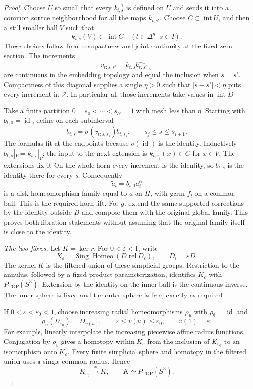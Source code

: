 \begin{proof}
Choose $U$ so small that every $k_{t,s}^{-1}$ is defined on $U$
and sends it into a common source neighbourhood for all the maps
$k_{t,s'}$.  Choose $C\subset\operatorname{int}U$, and then a
still smaller ball $V$ such that
\[
                  k_{t,s}(V)\subset\operatorname{int}C
                  \quad(t\in\Delta^q,\ s\in I).
\]
These choices follow from compactness and joint continuity at the
fixed zero section.  The increments
\[
          v_{t;s,s'}=k_{t,s}k_{t,s'}^{-1}|_U
\]
are continuous in the embedding topology and equal the inclusion
when $s=s'$.  Compactness of this diagonal supplies a single
$\eta>0$ such that $|s-s'|<\eta$ puts every increment in
$\mathcal V$.  In particular all those increments take values in
$\operatorname{int}D$.

Take a finite partition $0=s_0<\cdots<s_N=1$ with mesh less
than $\eta$.  Starting with $b_{t,0}=\operatorname{id}$, define
on each subinterval
\[
 b_{t,s}=\sigma(v_{t;s,s_j})b_{t,s_j},
                  \qquad s_j\leq s\leq s_{j+1}.
\]
The formulas fit at the endpoints because $\sigma(\operatorname{id})$
is the identity.  Inductively $b_{t,s}|_V=k_{t,s}|_V$: the input
to the next extension is $k_{t,s_j}(x)\in C$ for $x\in V$.
The extensions fix $0$.  On the whole horn every increment is
the identity, so $b_{t,s}$ is the identity there for every $s$.
Consequently
\[
                       \widetilde a_t=b_{t,1}a^0_t
\]
is a disk-homeomorphism family equal to $a$ on $H$, with germ
$f_t$ on a common ball.  This is the required horn lift.  For $g$,
extend the same supported corrections by the identity outside
$D$ and compose them with the original global family.  This proves
both fibration statements without assuming that the original
family itself is close to the identity.

\medskip\noindent\textit{The two fibres.}
Let $K=\ker r$.  For $0<\varepsilon<1$, write
\[
 K_\varepsilon=
 \operatorname{Sing}\operatorname{Homeo}
              (D\;\mathrm{rel}\;D_\varepsilon),
 \qquad D_\varepsilon=\varepsilon D.
\]
The kernel $K$ is the filtered union of these simplicial groups.
Restriction to the annulus, followed by a fixed product
parameterization, identifies $K_\varepsilon$ with
$P_{\mathrm{TOP}}(S^3)$.  Extension by the identity on the inner
ball is the continuous inverse.  The inner sphere is fixed and
the outer sphere is free, exactly as required.

If $0<\varepsilon<\varepsilon_0<1$, choose increasing radial
homeomorphisms $\rho_u$ with $\rho_0=\operatorname{id}$ and
\[
 \rho_u(D_{\varepsilon_0})=D_{v(u)},\qquad
 \varepsilon\leq v(u)\leq\varepsilon_0,
 \qquad v(1)=\varepsilon.
\]
For example, linearly interpolate the increasing piecewise affine
radius functions.  Conjugation by $\rho_u$ gives a homotopy within
$K_\varepsilon$ from the inclusion of $K_{\varepsilon_0}$ to an
isomorphism onto $K_\varepsilon$.  Every finite simplicial sphere
and homotopy in the filtered union uses a single common radius.
Hence
\[
          K_{\varepsilon_0}\xrightarrow{\ \simeq\ }K,
                 \qquad K\simeq P_{\mathrm{TOP}}(S^3).
\]


\end{proof}
